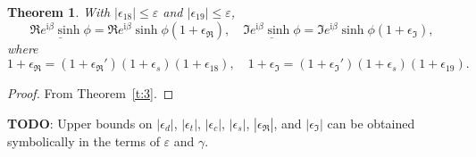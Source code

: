 \documentclass[a4paper,12pt,twoside]{article}
\newtheorem{thm}{Theorem}
\begin{document}
\begin{thm}\label{t:4}
  With $|\epsilon_{18}|\le\varepsilon$ and
  $|\epsilon_{19}|\le\varepsilon$,
  \begin{displaymath}
    \underline{\Re{e^{\mathrm{i}\beta}}\sinh\phi}=\Re{e^{\mathrm{i}\beta}}\sinh\phi(1+\epsilon_{\Re}^{}),\quad
    \underline{\Im{e^{\mathrm{i}\beta}}\sinh\phi}=\Im{e^{\mathrm{i}\beta}}\sinh\phi(1+\epsilon_{\Im}^{}),
  \end{displaymath}
  where
  \begin{equation}
    1+\epsilon_{\Re}^{}=(1+\epsilon_{\Re}')(1+\epsilon_s^{})(1+\epsilon_{18}),\quad
    1+\epsilon_{\Im}^{}=(1+\epsilon_{\Im}')(1+\epsilon_s^{})(1+\epsilon_{19}).
    \label{e:26}
  \end{equation}
\end{thm}
\begin{proof}
  From Theorem~\ref{t:3}.
\end{proof}

\textbf{TODO}: Upper bounds on $|\epsilon_d|$, $|\epsilon_t|$,
$|\epsilon_c|$, $|\epsilon_s|$, $|\epsilon_{\Re}|$, and
$|\epsilon_{\Im}|$ can be obtained symbolically in the terms of
$\varepsilon$ and $\gamma$.
\end{document}
